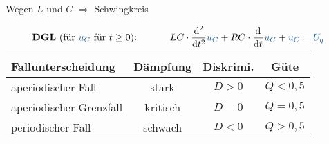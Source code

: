 \begin{frame}
{\begin{minipage}{\textwidth}
\begin{minipage}[t][3.5cm][]{0.48\textwidth}
        Wegen $L$ und $C$ $\Rightarrow$ Schwingkreis
    \end{minipage}%
    \begin{minipage}[t][3.5cm][]{0.48\textwidth}\centering
    \end{minipage}
\end{minipage}\vspace{2pt}

    \begin{align*}
    &\text{\textbf{DGL} (für $\ecv{u_C}$ für $t \geq 0$):}&    LC \cdot \dt[2] \ecv{u_C} + RC \cdot \dt \ecv{u_C} + \ecv{u_C} &= \ecv{U_q}\\[-20pt]
    &\hphantom{R1oooooooooooooooooooo}&\hphantom{L2oooooooooooooooooooooooooooooo}&\hphantom{R2ooo} %
    \end{align*}

    \begin{table}[H]\centering
        \begin{tabular}{lccc} \toprule
            \textbf{Fallunterscheidung} & \textbf{Dämpfung} & \textbf{Diskrimi.} & \textbf{Güte} \\ \midrule
            aperiodischer Fall          & stark             & $D > 0$               & $Q < 0,5$ \\
            aperiodischer Grenzfall     & kritisch          & $D = 0$               & $Q = 0,5$ \\
            periodischer Fall           & schwach           & $D < 0$               & $Q > 0,5$ \\ \bottomrule
        \end{tabular}
    \end{table}
}%
\end{frame}%

